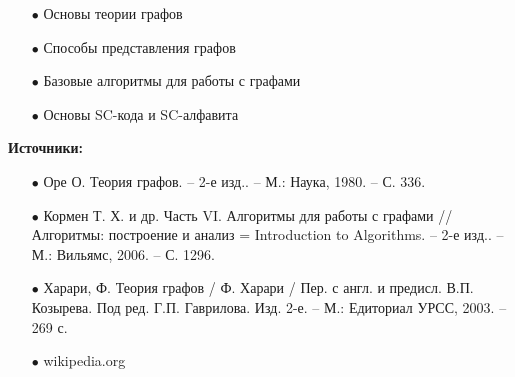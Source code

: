 \documentclass[10pt,a4paper,twocolumn]{article}
\begin{document}
\begin{enumerate}
	\item[$\bullet$] Основы теории графов
	\item[$\bullet$] Способы представления графов
	\item[$\bullet$] Базовые алгоритмы для работы с графами
	\item[$\bullet$] Основы SC-кода и SC-алфавита
\end{enumerate}
\large{\textbf{Источники:}}
\begin{enumerate}
	\item[$\bullet$] Оре О. Теория графов. – 2-е изд.. – М.: Наука, 1980. – С. 336.
	\item[$\bullet$] Кормен Т. Х. и др. Часть VI. Алгоритмы для работы с графами // Алгоритмы: построение и анализ = Introduction to Algorithms. – 2-е изд.. – М.: Вильямс, 2006. – С. 1296.
	\item[$\bullet$] Харари, Ф. Теория графов / Ф. Харари / Пер. с англ. и предисл. В.П. Козырева. Под ред. Г.П. Гаврилова. Изд. 2-е. – М.: Едиториал УРСС, 2003. – 269 с.
    \item[$\bullet$]  wikipedia.org
\end{enumerate}
\end{document}
